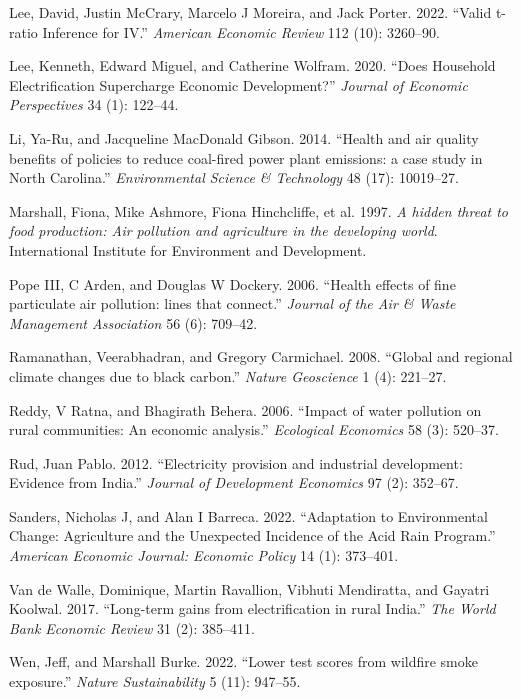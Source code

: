 \documentclass[
]{article}
\newlength{\cslhangindent}
\newlength{\cslentryspacingunit} %
\newenvironment{CSLReferences}[2] %
 {%
  \setlength{\parindent}{0pt}
  \ifodd #1
  \let\oldpar\par
  \def\par{\hangindent=\cslhangindent\oldpar}
  \fi
  \setlength{\parskip}{#2\cslentryspacingunit}
 }%
 {}
\begin{document}
\begin{CSLReferences}{1}{0}
\leavevmode{}%
Lee, David, Justin McCrary, Marcelo J Moreira, and Jack Porter. 2022. {``{Valid t-ratio Inference for IV}.''} \emph{{American Economic Review}} 112 (10): 3260--90.

\leavevmode{}%
Lee, Kenneth, Edward Miguel, and Catherine Wolfram. 2020. {``Does Household Electrification Supercharge Economic Development?''} \emph{{Journal of Economic Perspectives}} 34 (1): 122--44.

\leavevmode{}%
Li, Ya-Ru, and Jacqueline MacDonald Gibson. 2014. {``{Health and air quality benefits of policies to reduce coal-fired power plant emissions: a case study in North Carolina}.''} \emph{{Environmental Science \& Technology}} 48 (17): 10019--27.

\leavevmode{}%
Marshall, Fiona, Mike Ashmore, Fiona Hinchcliffe, et al. 1997. \emph{{A hidden threat to food production: Air pollution and agriculture in the developing world}}. {International Institute for Environment and Development.}

\leavevmode{}%
Pope III, C Arden, and Douglas W Dockery. 2006. {``{Health effects of fine particulate air pollution: lines that connect}.''} \emph{{Journal of the Air \& Waste Management Association}} 56 (6): 709--42.

\leavevmode{}%
Ramanathan, Veerabhadran, and Gregory Carmichael. 2008. {``{Global and regional climate changes due to black carbon}.''} \emph{{Nature Geoscience}} 1 (4): 221--27.

\leavevmode{}%
Reddy, V Ratna, and Bhagirath Behera. 2006. {``{Impact of water pollution on rural communities: An economic analysis}.''} \emph{{Ecological Economics}} 58 (3): 520--37.

\leavevmode{}%
Rud, Juan Pablo. 2012. {``{Electricity provision and industrial development: Evidence from India}.''} \emph{{Journal of Development Economics}} 97 (2): 352--67.

\leavevmode{}%
Sanders, Nicholas J, and Alan I Barreca. 2022. {``{Adaptation to Environmental Change: Agriculture and the Unexpected Incidence of the Acid Rain Program}.''} \emph{{American Economic Journal: Economic Policy}} 14 (1): 373--401.

\leavevmode{}%
Van de Walle, Dominique, Martin Ravallion, Vibhuti Mendiratta, and Gayatri Koolwal. 2017. {``{Long-term gains from electrification in rural India}.''} \emph{{The World Bank Economic Review}} 31 (2): 385--411.

\leavevmode{}%
Wen, Jeff, and Marshall Burke. 2022. {``{Lower test scores from wildfire smoke exposure}.''} \emph{{Nature Sustainability}} 5 (11): 947--55.

\end{CSLReferences}
\end{document}

